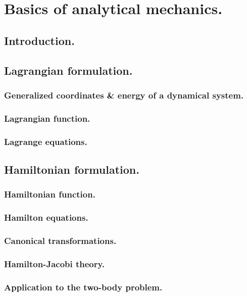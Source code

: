 \chapter{Basics of analytical mechanics.}
%
\label{app: 	Analytical_mechanics}
%
\section{Introduction.}
%
%
\section{Lagrangian formulation.}
%
%
	\subsection{Generalized coordinates \& energy of a dynamical system.}
	\subsection{Lagrangian function.}
	\subsection{Lagrange equations.}
\section{Hamiltonian formulation.}
%
%
	\subsection{Hamiltonian function.}
	\subsection{Hamilton equations.}
	\subsection{Canonical transformations.}
	\subsection{Hamilton-Jacobi theory.}
	\subsection{Application to the two-body problem.}
